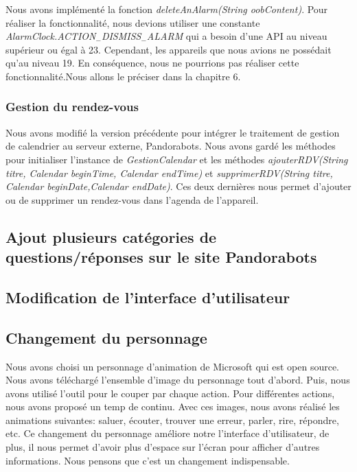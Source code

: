 \indent Nous avons implémenté la fonction \emph{deleteAnAlarm(String oobContent)}. Pour réaliser la fonctionnalité, nous devions utiliser une constante \emph{AlarmClock.ACTION$_-$DISMISS$_-$ALARM} qui a besoin d'une API au niveau supérieur ou égal à 23. Cependant, les appareils que nous avions ne possédait qu'au niveau 19. En conséquence, nous ne pourrions pas réaliser cette fonctionnalité.Nous allons le préciser dans la chapitre 6.\\

\subsubsection{Gestion du rendez-vous}
\indent Nous avons modifié la version précédente pour intégrer le traitement de gestion de calendrier au serveur externe, Pandorabots. Nous avons gardé les méthodes pour initialiser l'instance de \emph{GestionCalendar} et les méthodes \emph{ajouterRDV(String titre, Calendar beginTime, Calendar endTime)} et \emph{supprimerRDV(String titre, Calendar beginDate,Calendar endDate)}. Ces deux dernières nous permet d'ajouter ou de supprimer un rendez-vous dans l'agenda de l'appareil.

\subsection{Ajout plusieurs catégories de questions/réponses sur le site Pandorabots}

\subsection{Modification de l'interface d'utilisateur}


\subsection{Changement du personnage}
\indent Nous avons choisi un personnage d'animation de Microsoft qui est open source. Nous avons téléchargé l'ensemble d'image du personnage tout d'abord. Puis, nous avons utilisé l'outil pour le couper par chaque action. Pour différentes actions, nous avons proposé un temp de continu. Avec ces images, nous avons réalisé les animations  suivantes: saluer, écouter, trouver une  erreur, parler, rire, répondre, etc. Ce changement du personnage améliore notre l'interface d'utilisateur, de plus, il nous permet d'avoir plus d'espace sur l'écran pour afficher d'autres informations. Nous pensons que c'est un changement indispensable.
